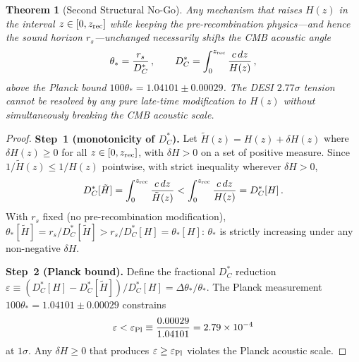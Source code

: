 \documentclass[12pt,a4paper]{article}
\newcommand{\thetastar}{\theta_*}
\newcommand{\rs}{r_s}
\newcommand{\DC}{D_C^*}
\theoremstyle{plain}
\newtheorem{theorem}{Theorem}
\begin{document}
\begin{theorem}[Second Structural No-Go]
\label{thm:nogo2}
Any mechanism that raises $H(z)$ in the interval $z\in[0,z_{\rm rec}]$
while keeping the pre-recombination physics---and hence the sound horizon
$\rs$---unchanged necessarily shifts the CMB acoustic angle
\begin{equation}
  \thetastar = \frac{\rs}{\DC}\,,
  \qquad
  \DC = \int_0^{z_{\rm rec}} \frac{c\,dz}{H(z)}\,,
  \label{eq:theta-proof}
\end{equation}
above the Planck bound $100\thetastar = 1.04101\pm0.00029$.
The DESI $2.77\sigma$ tension cannot be resolved by any pure late-time
modification to $H(z)$ without simultaneously breaking the CMB acoustic scale.
\end{theorem}

\begin{proof}
\textbf{Step~1 (monotonicity of $\DC$).}
Let $\tilde H(z) = H(z) + \delta H(z)$ where $\delta H(z) \geq 0$ for all
$z \in [0,z_{\rm rec}]$, with $\delta H > 0$ on a set of positive measure.
Since $1/\tilde H(z) \leq 1/H(z)$ pointwise, with strict inequality wherever
$\delta H > 0$,
\begin{equation}
  \DC[\tilde H]
  = \int_0^{z_{\rm rec}} \frac{c\,dz}{\tilde H(z)}
  < \int_0^{z_{\rm rec}} \frac{c\,dz}{H(z)}
  = \DC[H]\,.
  \label{eq:dc-ineq}
\end{equation}
With $\rs$ fixed (no pre-recombination modification),
$\thetastar[\tilde H] = \rs/\DC[\tilde H] > \rs/\DC[H] = \thetastar[H]$:
$\thetastar$ is strictly increasing under any non-negative $\delta H$.

\textbf{Step~2 (Planck bound).}
Define the fractional $\DC$ reduction
$\varepsilon \equiv (\DC[H] - \DC[\tilde H])/\DC[H] = \Delta\thetastar/\thetastar$.
The Planck measurement $100\thetastar = 1.04101 \pm 0.00029$ constrains
\begin{equation}
  \varepsilon < \varepsilon_{\rm Pl}
  \equiv \frac{0.00029}{1.04101} = 2.79\times10^{-4}
  \label{eq:planck-eps}
\end{equation}
at $1\sigma$. Any $\delta H \geq 0$ that produces $\varepsilon \geq
\varepsilon_{\rm Pl}$ violates the Planck acoustic scale.


\end{proof}
\end{document}
